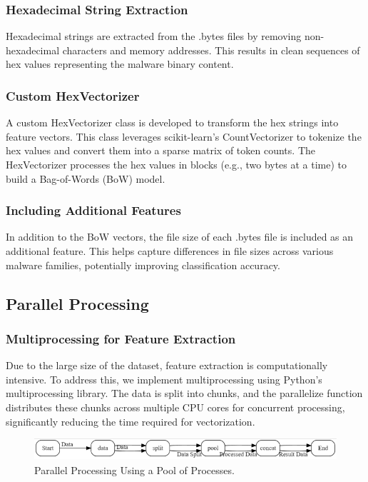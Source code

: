 \documentclass[conference]{IEEEtran}
\begin{document}
\subsubsection{Hexadecimal String Extraction}
Hexadecimal strings are extracted from the .bytes files by removing non-hexadecimal characters and memory addresses. This results in clean sequences of hex values representing the malware binary content.

\subsubsection{Custom HexVectorizer}
A custom HexVectorizer class is developed to transform the hex strings into feature vectors. This class leverages scikit-learn’s CountVectorizer to tokenize the hex values and convert them into a sparse matrix of token counts. The HexVectorizer processes the hex values in blocks (e.g., two bytes at a time) to build a Bag-of-Words (BoW) model.

\subsubsection{Including Additional Features}
In addition to the BoW vectors, the file size of each .bytes file is included as an additional feature. This helps capture differences in file sizes across various malware families, potentially improving classification accuracy.


\subsection{Parallel Processing}
\subsubsection{Multiprocessing for Feature Extraction}
Due to the large size of the dataset, feature extraction is computationally intensive. To address this, we implement multiprocessing using Python's multiprocessing library. The data is split into chunks, and the parallelize function distributes these chunks across multiple CPU cores for concurrent processing, significantly reducing the time required for vectorization.
\begin{figure}[h]
    \centerline{\includegraphics[width=\linewidth]{fig1.png}}
    \caption{Parallel Processing Using a Pool of Processes.}
    \label{fig1}
\end{figure}
\end{document}
